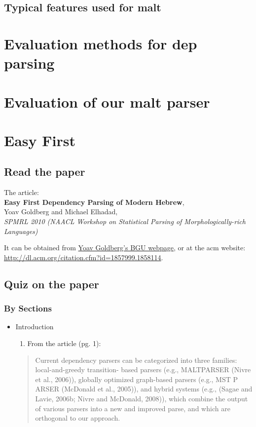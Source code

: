 \documentclass[11pt]{article}
\begin{document}
\subsection{Typical features used for malt}
\label{sec-4-2}
\section{Evaluation methods for dep parsing}
\label{sec-5}
\section{Evaluation of our malt parser}
\label{sec-6}
\section{Easy First}
\label{sec-7}
\subsection{Read the paper}
\label{sec-7-1}


The article: \\
\textbf{Easy First Dependency Parsing of Modern Hebrew}, \\
   Yoav Goldberg and Michael Elhadad, \\
   \emph{SPMRL 2010 (NAACL Workshop on Statistical Parsing of    Morphologically-rich Languages)}


It can be obtained from \href{http://www.cs.bgu.ac.il/~yoavg/publications/naacl2010dep.pdf}{Yoav Goldberg's BGU webpage}, or at the acm
website: 
\href{http://dl.acm.org/citation.cfm?id=1857999.1858114}{http://dl.acm.org/citation.cfm?id=1857999.1858114}.


   
\subsection{Quiz on the paper}
\label{sec-7-2}
\subsubsection{By Sections}
\label{sec-7-2-1}
\begin{itemize}

\item Introduction
\label{sec-7-2-1-1}%
\begin{enumerate}
\item From the article (pg. 1):
\end{enumerate}
\begin{quote}
Current dependency parsers can be categorized
into three families: local-and-greedy transition-
based parsers (e.g., MALTPARSER (Nivre et al.,
2006)), globally optimized graph-based parsers
(e.g., MST P ARSER (McDonald et al., 2005)), and
hybrid systems (e.g., (Sagae and Lavie, 2006b;
Nivre and McDonald, 2008)), which combine the
output of various parsers into a new and improved
parse, and which are orthogonal to our approach.

\end{quote}
\end{itemize} %
\end{document}
